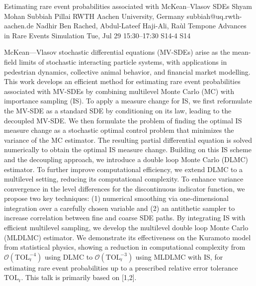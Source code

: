 \begin{talk}
  {Estimating rare event probabilities associated with McKean--Vlasov SDEs}%
  {Shyam Mohan Subbiah Pillai}%
  {RWTH Aachen University, Germany}%
  {subbiah@uq.rwth-aachen.de}%
  {Nadhir Ben Rached, Abdul-Lateef Haji-Ali, Raùl Tempone}%
  {Advances in Rare Events Simulation}%
  {Tue, Jul 29 15:30–17:30}%
  {S14-4}%
  {S14}%
				
			
McKean---Vlasov stochastic differential equations (MV-SDEs) arise as the mean-field limits of stochastic interacting particle systems, with applications in pedestrian dynamics, collective animal behavior, and financial market modelling. This work develops an efficient method for estimating rare event probabilities associated with MV-SDEs by combining multilevel Monte Carlo (MC) with importance sampling (IS). To apply a measure change for IS, we first reformulate the MV-SDE as a standard SDE by conditioning on its law, leading to the decoupled MV-SDE. We then formulate the problem of finding the optimal IS measure change as a stochastic optimal control problem that minimizes the variance of the MC estimator. The resulting partial differential equation is solved numerically to obtain the optimal IS measure change. Building on this IS scheme and the decoupling approach, we introduce a double loop Monte Carlo (DLMC) estimator. To further improve computational efficiency, we extend DLMC to a multilevel setting, reducing its computational complexity. To enhance variance convergence in the level differences for the discontinuous indicator function, we propose two key techniques: (1) numerical smoothing via one-dimensional integration over a carefully chosen variable and (2) an antithetic sampler to increase correlation between fine and coarse SDE paths. By integrating IS with efficient multilevel sampling, we develop the multilevel double loop Monte Carlo (MLDLMC) estimator. We demonstrate its effectiveness on the Kuramoto model from statistical physics, showing a reduction in computational complexity from $\mathcal{O}(\mathrm{TOL}_\mathrm{r}^{-4})$ using DLMC to $\mathcal{O}(\mathrm{TOL}_\mathrm{r}^{-3})$ using MLDLMC with IS, for estimating rare event probabilities up to a prescribed relative error tolerance $\mathrm{TOL}_\mathrm{r}$. This talk is primarily based on [1,2].

\medskip


\end{talk}
